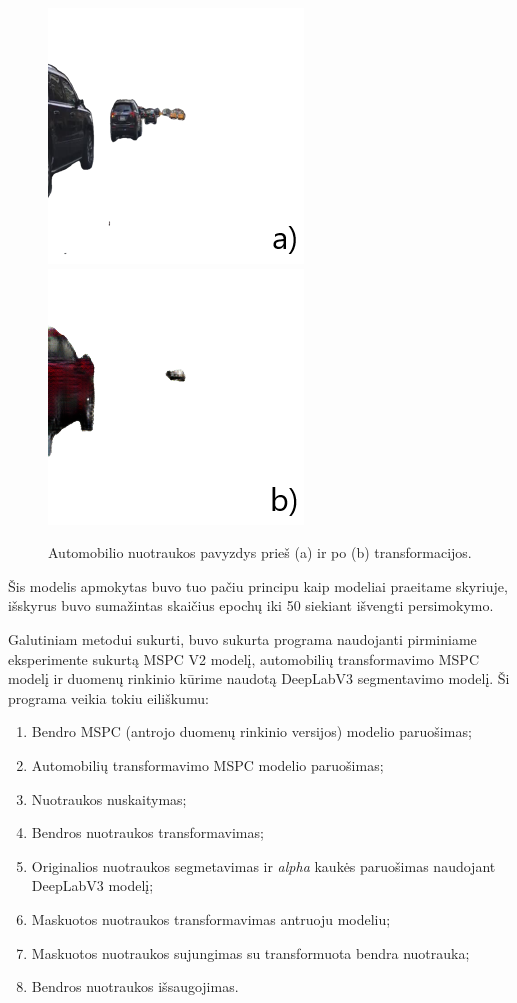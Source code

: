 \documentclass{VUMIFPSbakalaurinis}
\begin{document}
        \begin{figure}[H]
            \centering
            \includegraphics[scale=0.8]{img/CarTrans/before}
            \includegraphics[scale=0.8]{img/CarTrans/after}
            \caption{Automobilio nuotraukos pavyzdys prieš (a) ir po (b) transformacijos.}
            \label{img:mlp}
        \end{figure}

        Šis modelis apmokytas buvo tuo pačiu principu kaip modeliai praeitame skyriuje, išskyrus buvo sumažintas skaičius epochų iki 50 siekiant išvengti persimokymo.

        Galutiniam metodui sukurti, buvo sukurta programa naudojanti pirminiame eksperimente sukurtą MSPC V2 modelį, automobilių transformavimo MSPC modelį ir duomenų rinkinio kūrime naudotą DeepLabV3 segmentavimo modelį. Ši programa veikia tokiu eiliškumu:
            \begin{enumerate}
                \item Bendro MSPC (antrojo duomenų rinkinio versijos) modelio paruošimas;
                \item Automobilių transformavimo MSPC modelio paruošimas;
                \item Nuotraukos nuskaitymas;
                \item Bendros nuotraukos transformavimas;
                \item Originalios nuotraukos segmetavimas ir \emph{alpha} kaukės paruošimas naudojant DeepLabV3 modelį;
                \item Maskuotos nuotraukos transformavimas antruoju modeliu;
                \item Maskuotos nuotraukos sujungimas su transformuota bendra nuotrauka;
                \item Bendros nuotraukos išsaugojimas.
            \end{enumerate}
\end{document}
